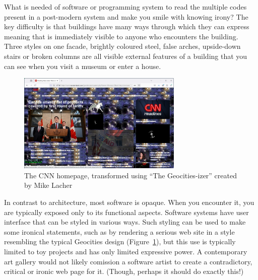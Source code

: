 What is needed of software or programming system to read the multiple codes present in a post-modern
system and make you smile with knowing irony? The key difficulty is that buildings have many
ways through which they can express meaning that is immediately visible to anyone who encounters
the building. Three styles on one facade, brightly coloured steel, false arches, upside-down
stairs or broken columns are all visible external features of a building that you can see
when you visit a museum or enter a house.

\begin{figure}
\centering
\vspace{-1em}
\includegraphics[width=0.7\textwidth]{fig/geocitiesizer.jpg}
\caption{The CNN homepage, transformed using ``The Geocities-izer'' created by Mike Lacher}
\label{fig:geocitiesizer}
\end{figure}

In contrast to architecture, most software is opaque. When you encounter it, you are typically
exposed only to its functional aspects. Software systems have user interface that can be styled
in various ways. Such styling can be used to make some ironical statements, such as by rendering
a serious web site in a style resembling the typical Geocities design (Figure~\ref{fig:geocitiesizer}),
but this use is typically limited to toy projects and has only limited expressive power.
A contemporary art gallery would not likely comission a software artist to create a contradictory,
critical or ironic web page for it. (Though, perhaps it should do exactly this!)

